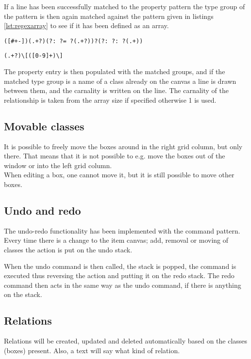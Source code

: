 If a line has been successfully matched to the property pattern the type group of the pattern is then again matched against the pattern given in listings \ref{lst:regexarray} to see if it has been defined as an array.

\begin{lstlisting}[caption={RegEx for property matching},label=lst:regexprop]
([#+-])(.+?)(?: ?= ?(.+?))?(?: ?: ?(.+))
\end{lstlisting}

\begin{lstlisting}[caption={RegEx for array matching},label=lst:regexarray]
(.+?)\[([0-9]+)\]
\end{lstlisting}

The property entry is then populated with the matched groups, and if the matched type group is a name of a class already on the canvas a line is drawn between them, and the carnality is written on the line.
The carnality of the relationship is taken from the array size if specified otherwise 1 is used.

\subsection{Movable classes}

It is possible to freely move the boxes around in the right grid column, but only there. That means that it is not possible to e.g. move the boxes out of the window or into the left grid column.\\
When editing a box, one cannot move it, but it is still possible to move other boxes.

\subsection{Undo and redo}
The undo-redo functionality has been implemented with the command pattern.
Every time there is a change to the item canvas; add, removal or moving of classes the action is put on the undo stack.

When the undo command is then called, the stack is popped, the command is executed thus reversing the action and putting it on the redo stack. The redo command then acts in the same way as the undo command, if there is anything on the stack.

\subsection{Relations}
Relations will be created, updated and deleted automatically based on the classes (boxes) present. Also, a text will say what kind of relation.

